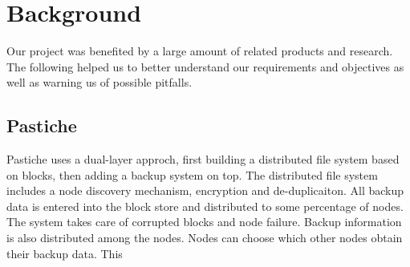 \section{Background}
Our project was benefited by a large amount of related products and research.
The following helped us to better understand our requirements and objectives as
well as warning us of possible pitfalls.
\subsection{Pastiche}
Pastiche uses a dual-layer approch, first building a distributed file system
based on blocks, then adding a backup system on top. The distributed file
system includes a node discovery mechanism, encryption and de-duplicaiton. All
backup data is entered into the block store and distributed to some percentage
of nodes. The system takes care of corrupted blocks and node failure. Backup
information is also distributed among the nodes. Nodes can choose which other
nodes obtain their backup data. This 
